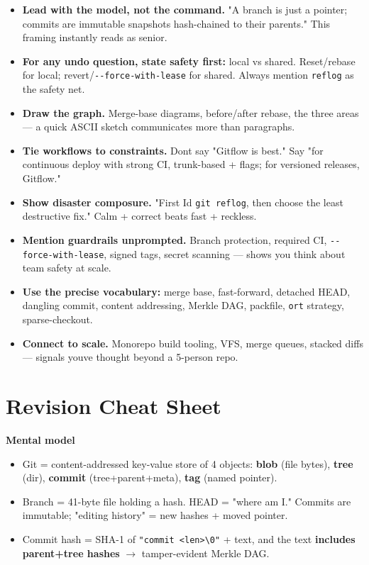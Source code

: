 \documentclass[11pt]{article}
\providecommand{\tightlist}{\setlength{\itemsep}{1pt}\setlength{\parskip}{0pt}}
\begin{document}
\begin{itemize}
\tightlist
\item
  \textbf{Lead with the model, not the command.} "A branch is just a pointer; commits are immutable snapshots hash-chained to their parents." This framing instantly reads as senior.
\item
  \textbf{For any \textquotesingle undo\textquotesingle{} question, state safety first:} local vs shared. Reset/rebase for local; revert/\texttt{-\/-force-with-lease} for shared. Always mention \texttt{reflog} as the safety net.
\item
  \textbf{Draw the graph.} Merge-base diagrams, before/after rebase, the three areas --- a quick ASCII sketch communicates more than paragraphs.
\item
  \textbf{Tie workflows to constraints.} Don\textquotesingle t say "Gitflow is best." Say "for continuous deploy with strong CI, trunk-based + flags; for versioned releases, Gitflow."
\item
  \textbf{Show disaster composure.} "First I\textquotesingle d \texttt{git\ reflog}, then choose the least destructive fix." Calm + correct beats fast + reckless.
\item
  \textbf{Mention guardrails unprompted.} Branch protection, required CI, \texttt{-\/-force-with-lease}, signed tags, secret scanning --- shows you think about team safety at scale.
\item
  \textbf{Use the precise vocabulary:} merge base, fast-forward, detached HEAD, dangling commit, content addressing, Merkle DAG, packfile, \texttt{ort} strategy, sparse-checkout.
\item
  \textbf{Connect to scale.} Monorepo build tooling, VFS, merge queues, stacked diffs --- signals you\textquotesingle ve thought beyond a 5-person repo.
\end{itemize}

\section{Revision Cheat Sheet}\label{revision-cheat-sheet}

\textbf{Mental model}

\begin{itemize}
\tightlist
\item
  Git = content-addressed key-value store of 4 objects: \textbf{blob} (file bytes), \textbf{tree} (dir), \textbf{commit} (tree+parent+meta), \textbf{tag} (named pointer).
\item
  Branch = 41-byte file holding a hash. HEAD = "where am I." Commits are immutable; "editing history" = new hashes + moved pointer.
\item
  Commit hash = SHA-1 of \texttt{"commit\ \textless{}len\textgreater{}\textbackslash{}0"} + text, and the text \textbf{includes parent+tree hashes} \(\rightarrow\) tamper-evident Merkle DAG.
\end{itemize}
\end{document}
